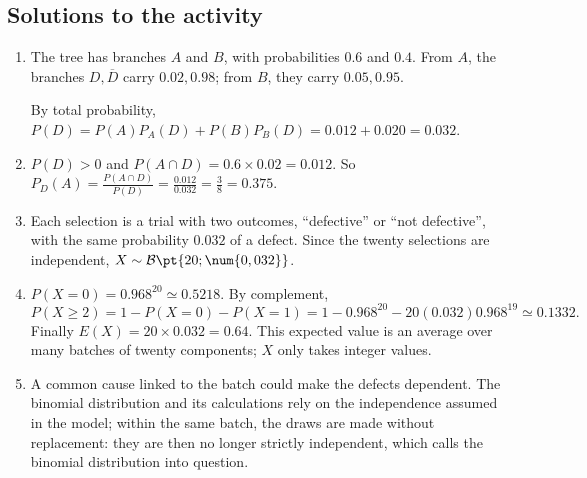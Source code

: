 \subsection{Solutions to the activity}\begin{enumerate}
\item The tree has branches $A$ and $B$, with probabilities $\num{0,6}$ and $\num{0,4}$. From $A$, the branches $D,\overline D$ carry $\num{0,02},\num{0,98}$; from $B$, they carry $\num{0,05},\num{0,95}$.
\begin{center}\end{center}
By total probability, $P(D)=P(A)P_A(D)+P(B)P_B(D)=\num{0,012}+\num{0,020}=\num{0,032}$.
\item $P(D)>0$ and $P(A\cap D)=\num{0,6}\times\num{0,02}=\num{0,012}$. So $P_D(A)=\frac{P(A\cap D)}{P(D)}=\frac{\num{0,012}}{\num{0,032}}=\frac{3}{8}=\num{0,375}$.
\item Each selection is a trial with two outcomes, ``defective'' or ``not defective'', with the same probability $\num{0,032}$ of a defect. Since the twenty selections are independent, $X\sim\mathcal B\pt{20;\num{0,032}}$.
\item $P(X=0)=\num{0,968}^{20}\simeq\num{0,5218}$. By complement,
\[P(X\ge2)=1-P(X=0)-P(X=1)=1-\num{0,968}^{20}-20(\num{0,032})\num{0,968}^{19}\simeq\num{0,1332}.\]
Finally $E(X)=20\times\num{0,032}=\num{0,64}$. This expected value is an average over many batches of twenty components; $X$ only takes integer values.
\item A common cause linked to the batch could make the defects dependent. The binomial distribution and its calculations rely on the independence assumed in the model; within the same batch, the draws are made without replacement: they are then no longer strictly independent, which calls the binomial distribution into question.
\end{enumerate}

